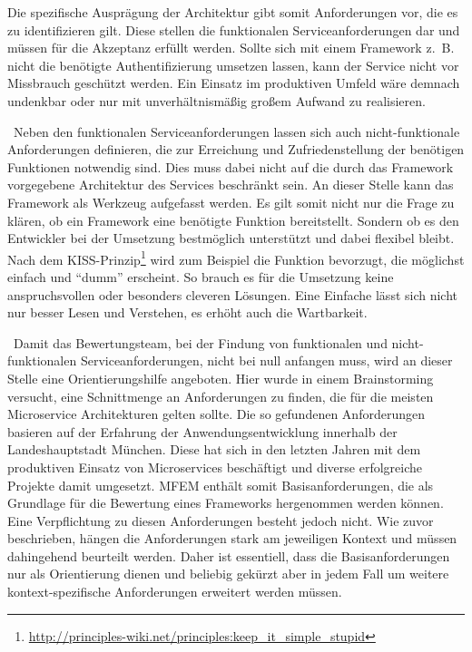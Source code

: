 
Die spezifische Ausprägung der Architektur gibt somit Anforderungen vor, die es zu identifizieren gilt. Diese stellen die funktionalen Serviceanforderungen dar und müssen für die Akzeptanz erfüllt werden. Sollte sich mit einem Framework z.~B. nicht die benötigte Authentifizierung umsetzen lassen, kann der Service nicht vor Missbrauch geschützt werden. Ein Einsatz im produktiven Umfeld wäre demnach undenkbar oder nur mit unverhältnismäßig großem Aufwand zu realisieren.

\
Neben den funktionalen Serviceanforderungen lassen sich auch nicht-funktionale Anforderungen definieren, die zur Erreichung und Zufriedenstellung der benötigen Funktionen notwendig sind. Dies muss dabei nicht auf die durch das Framework vorgegebene Architektur des Services beschränkt sein. An dieser Stelle kann das Framework als Werkzeug aufgefasst werden. Es gilt somit nicht nur die Frage zu klären, ob ein Framework eine benötigte Funktion bereitstellt. Sondern ob es den Entwickler bei der Umsetzung bestmöglich unterstützt und dabei flexibel bleibt. Nach dem KISS-Prinzip\footnote{
\url{http://principles-wiki.net/principles:keep_it_simple_stupid}
} 
wird zum Beispiel die Funktion bevorzugt, die möglichst einfach und \enquote{dumm} erscheint. So brauch es für die Umsetzung keine anspruchsvollen oder besonders cleveren Lösungen. Eine Einfache lässt sich nicht nur besser Lesen und Verstehen, es erhöht auch die Wartbarkeit.  

\
Damit das Bewertungsteam, bei der Findung von funktionalen und nicht-funktionalen Serviceanforderungen, nicht bei null anfangen muss, wird an dieser Stelle eine Orientierungshilfe angeboten. Hier wurde in einem Brainstorming versucht, eine Schnittmenge an Anforderungen zu finden, die für die meisten Microservice Architekturen gelten sollte. 
Die so gefundenen Anforderungen basieren auf der Erfahrung der Anwendungsentwicklung innerhalb der Landeshauptstadt München. Diese hat sich in den letzten Jahren mit dem produktiven Einsatz von Microservices beschäftigt und diverse erfolgreiche Projekte damit umgesetzt.
\ac{MFEM} enthält somit Basisanforderungen, die als Grundlage für die Bewertung eines Frameworks hergenommen werden können. Eine Verpflichtung zu diesen Anforderungen besteht jedoch nicht. Wie zuvor beschrieben, hängen die Anforderungen stark am jeweiligen Kontext und müssen dahingehend beurteilt werden. Daher ist essentiell, dass die Basisanforderungen nur als Orientierung dienen und beliebig gekürzt aber in jedem Fall um weitere kontext-spezifische Anforderungen erweitert werden müssen.  

